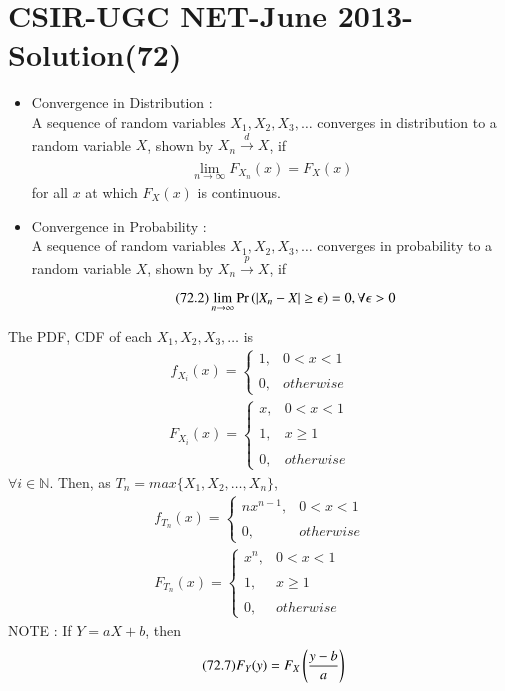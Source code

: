 \documentclass[journal,12pt,twocolumn]{IEEEtran}
\begin{document}
\section*{CSIR-UGC NET-June 2013-Solution(72)}
\begin{itemize}
\item Convergence in Distribution :\\
A sequence of random variables $X_{1},X_{2},X_{3},\dots$ converges in distribution to a random variable $X$, shown by $X_{n}\xrightarrow[]{d}X$, if
\begin{align}
\tag{72.1}
    \displaystyle\lim_{n\to\infty}F_{X_{n}}(x)=F_{X}(x)
\end{align}
for all $x$ at which $F_{X}(x)$ is continuous.\\
\item Convergence in Probability :\\
A sequence of random variables $X_{1},X_{2},X_{3},\dots$ converges in probability to a random variable $X$, shown by $X_{n}\xrightarrow[]{p}X$, if
\begin{align}
\tag{72.2}
    \displaystyle\lim_{n\to\infty}\Pr\left(|X_{n}-X|\geq\epsilon\right)=0,\forall\epsilon>0
\end{align}
\end{itemize}
The PDF, CDF of each $X_{1},X_{2},X_{3},\dots$ is 
\begin{align}
\tag{72.3}
    f_{X_{i}}(x)=\begin{cases}
	1, & 0< x<1 \\~\\[-1em]
	0, & otherwise
	\end{cases} 
\end{align}
\begin{align}
\tag{72.4}
	F_{X_{i}}(x)=\begin{cases}
	x, & 0< x<1 \\~\\[-1em]
	1, & x\geq 1\\~\\[-1em]
	0, & otherwise
	\end{cases} 
\end{align}
$\forall i\in \mathbb{N}$.
Then, as $T_{n}=max\{ X_{1},X_{2},\dots,X_{n}\}$,
\begin{align}
\tag{72.5}
    f_{T_{n}}(x)=\begin{cases}
	nx^{n-1}, & 0< x<1 \\~\\[-1em]
	0, & otherwise
	\end{cases} \\
\tag{72.6}
	F_{T_{n}}(x)=\begin{cases}
	x^{n}, & 0< x<1 \\~\\[-1em]
	1, & x\geq 1\\~\\[-1em]
	0, & otherwise
	\end{cases} 
\end{align}
NOTE : If $Y=aX+b$, then
\begin{align}
\tag{72.7}
\label{eq:form}
    F_{Y}(y)=F_{X}\left(\dfrac{y-b}{a}\right)
\end{align}
\end{document}
